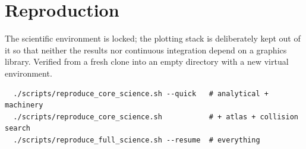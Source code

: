 \documentclass[aps,prd,onecolumn,superscriptaddress,nofootinbib]{revtex4-2}
\begin{document}
\section{Reproduction}\label{sec:repro}

The scientific environment is locked; the plotting stack is deliberately kept
out of it so that neither the results nor continuous integration depend on a
graphics library. Verified from a fresh clone into an empty directory with a new
virtual environment.

\begin{verbatim}
  ./scripts/reproduce_core_science.sh --quick   # analytical + machinery
  ./scripts/reproduce_core_science.sh           # + atlas + collision search
  ./scripts/reproduce_full_science.sh --resume  # everything
\end{verbatim}
\end{document}

